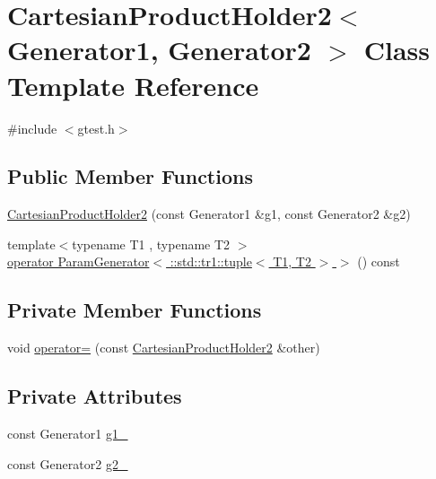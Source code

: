\hypertarget{classtesting_1_1internal_1_1CartesianProductHolder2}{\section{\-Cartesian\-Product\-Holder2$<$ \-Generator1, \-Generator2 $>$ \-Class \-Template \-Reference}
\label{da/d08/classtesting_1_1internal_1_1CartesianProductHolder2}
}


{\ttfamily \#include $<$gtest.\-h$>$}

\subsection*{\-Public \-Member \-Functions}
\begin{DoxyCompactItemize}
\item 
\hyperlink{classtesting_1_1internal_1_1CartesianProductHolder2_ae0a6a0d9c3c2305717436da625b97a5f}{\-Cartesian\-Product\-Holder2} (const \-Generator1 \&g1, const \-Generator2 \&g2)
\item 
{\footnotesize template$<$typename T1 , typename T2 $>$ }\\\hyperlink{classtesting_1_1internal_1_1CartesianProductHolder2_aa8c1c2ec679565453a3a7fbbddc6181b}{operator Param\-Generator$<$ \-::std\-::tr1\-::tuple$<$ T1, T2 $>$ $>$} () const 
\end{DoxyCompactItemize}
\subsection*{\-Private \-Member \-Functions}
\begin{DoxyCompactItemize}
\item 
void \hyperlink{classtesting_1_1internal_1_1CartesianProductHolder2_abb473debf0cc8e4eec854dc551a4af0a}{operator=} (const \hyperlink{classtesting_1_1internal_1_1CartesianProductHolder2}{\-Cartesian\-Product\-Holder2} \&other)
\end{DoxyCompactItemize}
\subsection*{\-Private \-Attributes}
\begin{DoxyCompactItemize}
\item 
const \-Generator1 \hyperlink{classtesting_1_1internal_1_1CartesianProductHolder2_a36a04c8f9e515291d6a093ab378084f7}{g1\-\_\-}
\item 
const \-Generator2 \hyperlink{classtesting_1_1internal_1_1CartesianProductHolder2_a6cfd9fa9a396d07747d5ebb1f05c7f22}{g2\-\_\-}
\end{DoxyCompactItemize}


